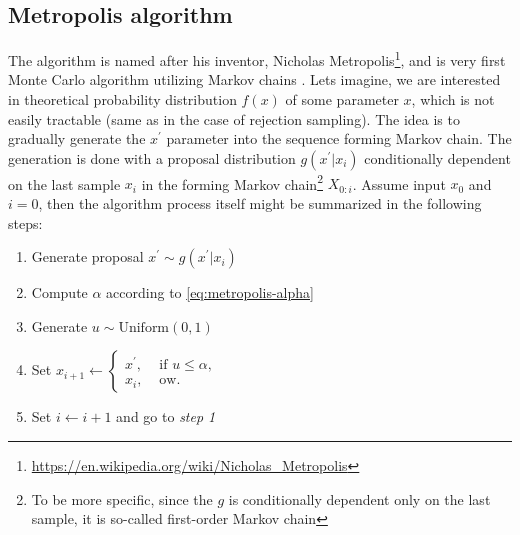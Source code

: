 \documentclass[
  digital, %
  oneside, %
  lof,     %
  lot,     %
]{fithesis4}
\begin{document}




\subsection{Metropolis algorithm}

The algorithm is named after his inventor, 
Nicholas Metropolis\footnote{\url{https://en.wikipedia.org/wiki/Nicholas_Metropolis}}, and is very first Monte 
Carlo algorithm utilizing Markov chains 
\cite{metropolis1953}.
Lets imagine, we are interested in theoretical 
probability distribution $f(x)$ of 
some parameter $x$, which is not easily tractable 
(same as in the case of rejection sampling).
The idea is to gradually generate the 
$x^\prime$ parameter into the sequence 
forming Markov chain.
The generation is done with a proposal distribution 
$g(x^\prime | x_{i})$ conditionally dependent on the last sample
$x_{i}$ in the forming Markov chain\footnote{To be more specific, since the $g$ is conditionally dependent only on the last sample, it is so-called first-order Markov chain} $X_{0:i}$.
Assume input $x_0$ and $i = 0$, then the algorithm process itself 
might be summarized in the following steps:

\begin{enumerate}
  \item Generate proposal $x^\prime \sim g(x^\prime | x_{i})$
  \item Compute $\alpha$ according to \eqref{eq:metropolis-alpha}
  \item Generate $u \sim \text{Uniform}(0, 1)$
  \item Set $x_{i+1} \leftarrow \begin{cases}
    x^\prime, & \text{ if } u \leq \alpha,\\
    x_{i}, & \text{ ow.}
    \end{cases}
    $
  \item Set $i \leftarrow i + 1$ and go to \textit{step 1}
\end{enumerate}
\end{document}
